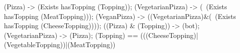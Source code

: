 (Pizza) -> (Exists hasTopping (Topping));
(VegetarianPizza) -> (~(Exists hasTopping (MeatTopping)));
(VeganPizza) -> ((VegetarianPizza)&(~(Exists hasTopping (CheeseTopping))));
((Pizza) & (Topping)) -> (bot);
(VegetarianPizza) -> (Pizza);
(Topping) == (((CheeseTopping)|(VegetableTopping))|(MeatTopping))
